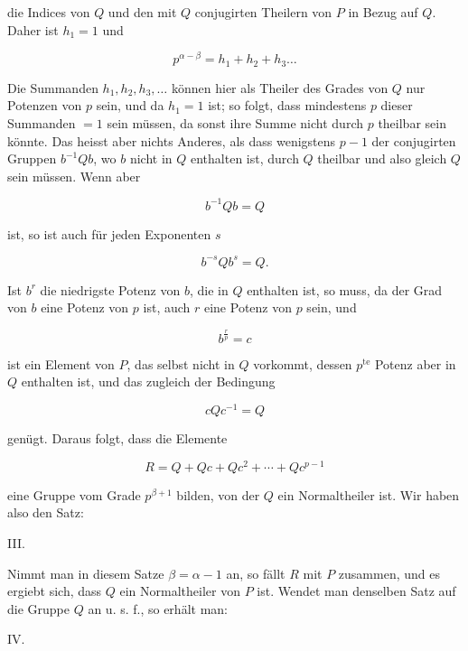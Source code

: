 die Indices von $Q$ und den mit $Q$ conjugirten Theilern von $P$ in Bezug auf $Q$. Daher ist $h_1 = 1$ und

\[
p^{\alpha-\beta} = h_1 + h_2 + h_3 \ldots %
\]

Die Summanden $h_1, h_2, h_3, \ldots$ können hier als Theiler des Grades von $Q$ nur Potenzen von $p$ sein, und da $h_1 = 1$ ist; so folgt, dass mindestens $p$ dieser Summanden $= 1$ sein müssen, da sonst ihre Summe nicht durch $p$ theilbar sein könnte. Das heisst aber nichts Anderes, als dass wenigstens $p - 1$ der conjugirten Gruppen $b^{-1}Qb$, wo $b$ nicht in $Q$ enthalten ist, durch $Q$ theilbar und also gleich $Q$ sein müssen. Wenn aber

\[
b^{-1}Qb = Q
\]

ist, so ist auch für jeden Exponenten $s$

\[
b^{-s}Qb^s = Q.
\]

Ist $b^r$ die niedrigste Potenz von $b$, die in $Q$ enthalten ist, so muss, da der Grad von $b$ eine Potenz von $p$ ist, auch $r$ eine Potenz von $p$ sein, und

\[
b^{\frac{r}{p}} = c
\]

ist ein Element von $P$, das selbst nicht in $Q$ vorkommt, dessen $p^{\text{te}}$ Potenz aber in $Q$ enthalten ist, und das zugleich der Bedingung

\[
cQc^{-1} = Q
\]

genügt. Daraus folgt, dass die Elemente

\[
R = Q + Qc + Qc^2 + \cdots + Qc^{p-1}
\]

eine Gruppe vom Grade $p^{\beta+1}$ bilden, von der $Q$ ein Normaltheiler ist. Wir haben also den Satz:

III. 

Nimmt man in diesem Satze $\beta = \alpha - 1$ an, so fällt $R$ mit $P$ zusammen, und es ergiebt sich, dass $Q$ ein Normaltheiler von $P$ ist. Wendet man denselben Satz auf die Gruppe $Q$ an u. s. f., so erhält man:

IV. 
